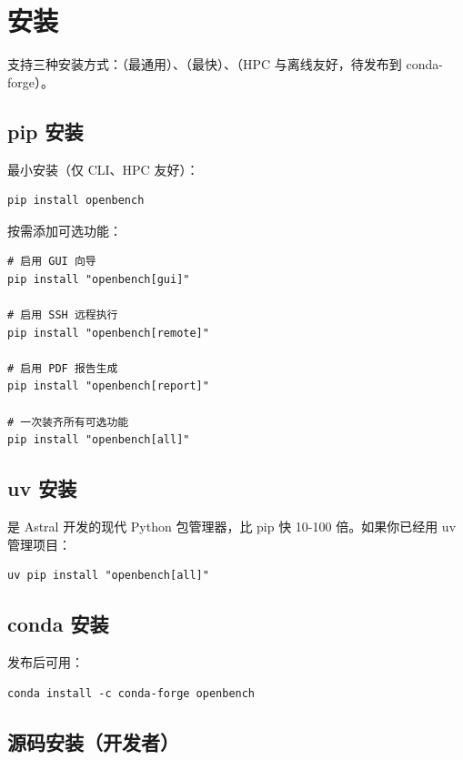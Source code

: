 \section{安装}

\openbench{} 支持三种安装方式：（最通用）、（最快）、（HPC 与离线友好，待发布到 conda-forge）。

\subsection{pip 安装}

最小安装（仅 CLI、HPC 友好）：

\begin{verbatim}
pip install openbench
\end{verbatim}

按需添加可选功能：

\begin{verbatim}
# 启用 GUI 向导
pip install "openbench[gui]"

# 启用 SSH 远程执行
pip install "openbench[remote]"

# 启用 PDF 报告生成
pip install "openbench[report]"

# 一次装齐所有可选功能
pip install "openbench[all]"
\end{verbatim}

\subsection{uv 安装}

 是 Astral 开发的现代 Python 包管理器，比 pip 快 10-100 倍。如果你已经用 uv 管理项目：

\begin{verbatim}
uv pip install "openbench[all]"
\end{verbatim}

\subsection{conda 安装}


发布后可用：

\begin{verbatim}
conda install -c conda-forge openbench
\end{verbatim}

\subsection{源码安装（开发者）}

